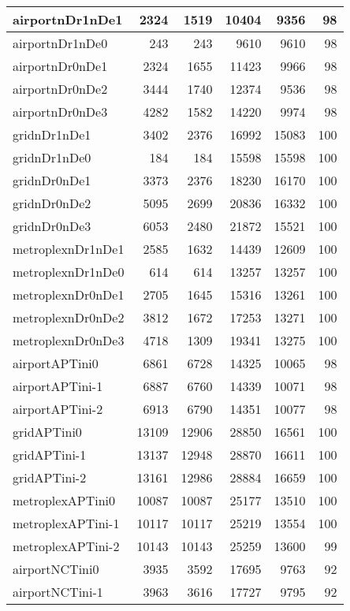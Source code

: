 \begin{longtable}{|l|r|r|r|r|r|}
\endlastfoot
airportnDr1nDe1 & 2324 & 1519 & 10404 & 9356 & 98 \\ \hline
airportnDr1nDe0 & 243 & 243 & 9610 & 9610 & 98 \\ \hline
airportnDr0nDe1 & 2324 & 1655 & 11423 & 9966 & 98 \\ \hline
airportnDr0nDe2 & 3444 & 1740 & 12374 & 9536 & 98 \\ \hline
airportnDr0nDe3 & 4282 & 1582 & 14220 & 9974 & 98 \\ \hline
gridnDr1nDe1 & 3402 & 2376 & 16992 & 15083 & 100 \\ \hline
gridnDr1nDe0 & 184 & 184 & 15598 & 15598 & 100 \\ \hline
gridnDr0nDe1 & 3373 & 2376 & 18230 & 16170 & 100 \\ \hline
gridnDr0nDe2 & 5095 & 2699 & 20836 & 16332 & 100 \\ \hline
gridnDr0nDe3 & 6053 & 2480 & 21872 & 15521 & 100 \\ \hline
metroplexnDr1nDe1 & 2585 & 1632 & 14439 & 12609 & 100 \\ \hline
metroplexnDr1nDe0 & 614 & 614 & 13257 & 13257 & 100 \\ \hline
metroplexnDr0nDe1 & 2705 & 1645 & 15316 & 13261 & 100 \\ \hline
metroplexnDr0nDe2 & 3812 & 1672 & 17253 & 13271 & 100 \\ \hline
metroplexnDr0nDe3 & 4718 & 1309 & 19341 & 13275 & 100 \\ \hline
airportAPTini0 & 6861 & 6728 & 14325 & 10065 & 98 \\ \hline
airportAPTini-1 & 6887 & 6760 & 14339 & 10071 & 98 \\ \hline
airportAPTini-2 & 6913 & 6790 & 14351 & 10077 & 98 \\ \hline
gridAPTini0 & 13109 & 12906 & 28850 & 16561 & 100 \\ \hline
gridAPTini-1 & 13137 & 12948 & 28870 & 16611 & 100 \\ \hline
gridAPTini-2 & 13161 & 12986 & 28884 & 16659 & 100 \\ \hline
metroplexAPTini0 & 10087 & 10087 & 25177 & 13510 & 100 \\ \hline
metroplexAPTini-1 & 10117 & 10117 & 25219 & 13554 & 100 \\ \hline
metroplexAPTini-2 & 10143 & 10143 & 25259 & 13600 & 99 \\ \hline
airportNCTini0 & 3935 & 3592 & 17695 & 9763 & 92 \\ \hline
airportNCTini-1 & 3963 & 3616 & 17727 & 9795 & 92 \\ \hline

\end{longtable}
